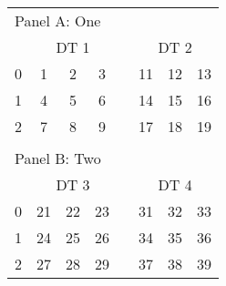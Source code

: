 \begin{table}
\centering
\begin{threeparttable}
\caption{}
\begin{tabular}{lccccccc}
\toprule
\multicolumn{8}{l}{Panel A: One}\\
  & \multicolumn{3}{c}{DT 1} &   & \multicolumn{3}{c}{DT 2}\\
\cmidrule(lr){2-4} \cmidrule(lr){6-8}
0 & 1 & 2 & 3  &   & 11 & 12 & 13 \\
1 & 4 & 5 & 6  &   & 14 & 15 & 16 \\
2 & 7 & 8 & 9  &   & 17 & 18 & 19 \\
  &   &   &   &   &   &   &  \\
\multicolumn{8}{l}{Panel B: Two}\\
  & \multicolumn{3}{c}{DT 3} &   & \multicolumn{3}{c}{DT 4}\\
\cmidrule(lr){2-4} \cmidrule(lr){6-8}
0 & 21 & 22 & 23  &   & 31 & 32 & 33 \\
1 & 24 & 25 & 26  &   & 34 & 35 & 36 \\
2 & 27 & 28 & 29  &   & 37 & 38 & 39 \\
\bottomrule

\end{tabular}
\end{threeparttable}
\end{table}